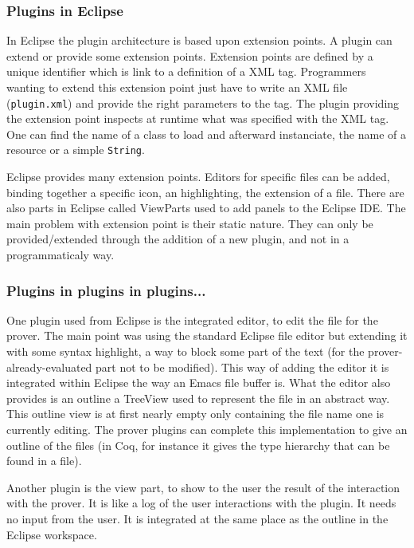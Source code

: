 \documentclass{llncs}
\begin{document}
\subsubsection{Plugins in Eclipse}
\label{subsubsec:plugins-eclipse}

In Eclipse the plugin architecture is based upon extension points.
A plugin can extend or provide some extension points. 
Extension points are defined by a unique identifier which is link
to a definition of a XML tag. Programmers wanting to extend
this extension point just have to write an XML file ({\tt plugin.xml}) 
and provide the right parameters to the tag.
The plugin providing the extension point inspects at runtime what was 
specified with the XML tag. One can find the name of a class to load
and afterward instanciate, the name of a resource or a simple {\tt String}.

Eclipse provides many extension points. Editors for specific files can be
added, binding together a specific icon, an highlighting, the extension of a
file. There are also parts in Eclipse called ViewParts used to add panels to 
the Eclipse IDE.
The main problem with extension point is their static nature.
They can only be provided/extended through the addition of a
new plugin, and not in a programmaticaly way.
\subsubsection{Plugins in plugins in plugins...}
\label{subsubsec:plug-plug-plug}
One plugin used from Eclipse is the integrated editor, to edit the 
file for the prover. The main point was using the standard Eclipse file editor
but extending it with some syntax highlight, a way to block some part
of the text (for the prover-already-evaluated part not to be modified). This
way of adding the editor it is integrated within Eclipse the way an Emacs 
file buffer is.  What the editor also provides is an outline a TreeView
used to represent the file in an abstract way. This outline view
is at first nearly empty only containing the file name one is currently
editing. The prover plugins can complete this implementation to give
an outline of the files (in Coq, for instance it gives the type
hierarchy that can be found in a file).

Another plugin is the view part, to show to the user the result of the
interaction with the prover. It is like a log of the user interactions
with the plugin. It needs no input from the user. It is integrated
at the same place as the outline in the Eclipse workspace.
\end{document}
